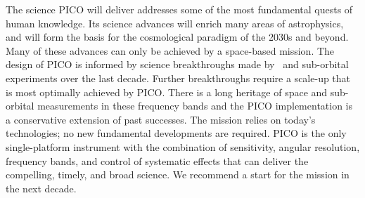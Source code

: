 \documentclass[PICOAPC.tex]{subfiles}
\begin{document}
The science PICO will deliver addresses some of the most fundamental quests of human knowledge. Its science advances will enrich many areas of astrophysics, and will form the basis for the cosmological paradigm of the 2030s and beyond.  Many of these advances can only be achieved by a space-based mission. The design of PICO is informed by science breakthroughs made by \planck\ and sub-orbital experiments over the last decade. Further breakthroughs require a scale-up that is most optimally achieved by PICO.  There is a long heritage of space and sub-orbital measurements in these frequency bands and the PICO implementation is a conservative extension of past successes. The mission relies on today's technologies; no new fundamental developments are required. PICO is the only single-platform instrument with the combination of sensitivity, angular resolution, frequency bands, and control of systematic effects that can deliver the compelling, timely, and broad science. We recommend a start for the mission in the next decade. 







\end{document}
